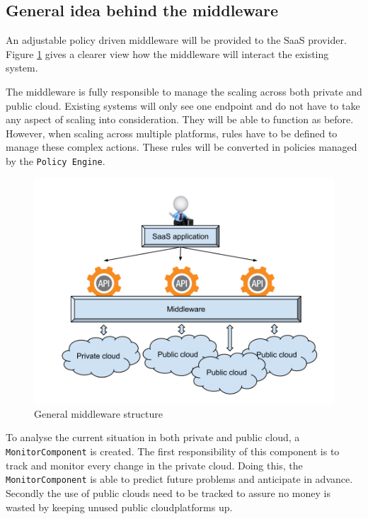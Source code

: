 \documentclass[journal]{IEEEtran}
\begin{document}
\subsection{General idea behind the middleware}
An adjustable policy driven middleware will be provided to the SaaS provider.
Figure \ref{fig:general-middleware} gives a clearer view how the middleware will interact the existing system.\newline

The middleware is fully responsible to manage the scaling across both private and public cloud.
Existing systems will only see one endpoint and do not have to take any aspect of scaling into consideration.
They will be able to function as before.
However, when scaling across multiple platforms, rules have to be defined to manage these complex actions.
These rules will be converted in policies managed by the \texttt{Policy Engine}.

\begin{figure}[h!]
    \centering
    \includegraphics[width=\linewidth]{images/GeneralMiddleware.png}
    \caption{General middleware structure}
    \label{fig:general-middleware}
\end{figure}

To analyse the current situation in both private and public cloud, a \texttt{MonitorComponent} is created.
The first responsibility of this component is to track and monitor every change in the private cloud.
Doing this, the \texttt{MonitorComponent} is able to predict future problems and anticipate in advance.
Secondly the use of public clouds need to be tracked to assure no money is wasted by keeping unused public cloudplatforms up.\newline
\end{document}
